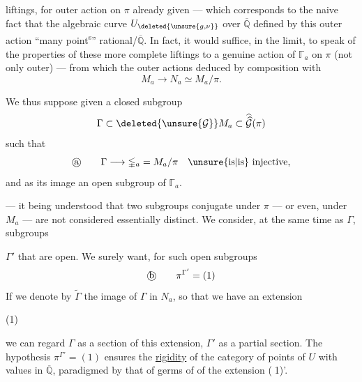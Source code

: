 
 liftings, for  outer action on $\pi$ already given --- which corresponds to the naive fact that the algebraic curve $U_{\deleted{\unsure{g,\nu}}}$ over $\overline{\mathbb Q}$ defined by this outer action  ``many point\textsuperscript{s}'' rational/$\overline{\mathbb Q}$. In fact, it would suffice, in the limit, to speak of the  properties of these more complete liftings to a genuine action of  $\mathbb{\Gamma}_a$ on $\pi$ (not only outer) --- from which the outer actions   deduced by composition with
\[
M_a \longrightarrow N_a \simeq M_a/\pi.
\]

 We thus suppose given a closed subgroup
\[
\Gamma \subset \deleted{\unsure{\mathcal G}} M_a \subset \widehat{\widehat{\mathcal G}}(\pi)
\]
such that
\[
\text{\textcircled{a}}\qquad
\Gamma \longrightarrow \mathbb{\Gamma}_a
 = M_a/\pi
\quad \text{\unsure{is|is} injective,}
\]
and  as its image an open subgroup of $\mathbb{\Gamma}_a$.

--- it being understood that two subgroups conjugate under $\pi$ --- or even,  under $M_a$ --- are not considered essentially distinct. We consider, at the same time as $\Gamma$, subgroups


$\Gamma'$ that are open. We surely want, for such open subgroups
\[
\text{\textcircled{b}}\qquad \pi^{\Gamma'}=(1)
\]
If we denote by $\widetilde{\Gamma}$ the image of $\Gamma$ in $N_a$, so that we have an extension
\begin{samepage}
(1)\quad
{}
\end{samepage}
we can regard $\Gamma$ as a section of this extension, $\Gamma'$ as a partial section. The hypothesis $\pi^{\Gamma'}=(1)$ ensures the \uline{rigidity} of the category of points of $U$ with values in $\overline{\mathbb Q}$, paradigmed by that of germs of  of the extension \textcircled{(1)'}.

